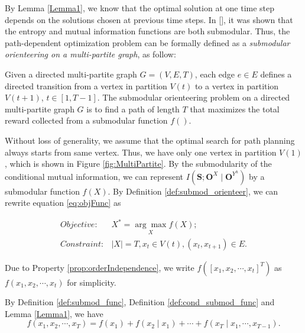 \documentclass[12pt]{article}
\begin{document}
By Lemma \ref{Lemma1}, we know that the optimal solution at one time step depends on the solutions chosen at previous time steps. 
In [\cite{krause2012submodular}], it was shown that the entropy and mutual information functions are both submodular.
Thus, the path-dependent optimization problem can be formally defined as a \emph{submodular orienteering on a multi-partite graph}, as follow:

\begin{mydef}
\label{def:submod_orienteer}
Given a directed multi-partite graph $ G = (V, E, T) $, each edge $ e \in E $ defines a directed transition from a vertex in partition $ V(t) $ to a vertex in partition $ V(t+1) $, $ t \in [1, T-1] $.
The submodular orienteering problem on a directed multi-partite graph $ G $ is to find a path of length $ T $ that maximizes the total reward collected from a submodular function $ f() $.
\end{mydef}

Without loss of generality, we assume that the optimal search for path planning always starts from same vertex.
Thus, we have only one vertex in partition $ V(1) $, which is shown in Figure \ref{fig:MultiPartite}.
By the submodularity of the conditional mutual information, we can represent $ I(\mathbf{S}; \mathbf{O}^{X} \mid \mathbf{O}^{Y^{h}}) $ by a submodular function  $ f(X) $. 
By Definition \ref{def:submod_orienteer}, we can rewrite equation 
 \eqref{eq:objFunc} as 

\begin{equation}
\label{eq:gnr_obj}
\begin{aligned}
Objective: & X^{*} = \underset{X}{\arg\max} f(X); \\
Constraint: & |X| = T, x_{t} \in V(t), (x_{t}, x_{t+1}) \in E.
\end{aligned}
\end{equation}

Due to Property \ref{prop:orderIndependence}, we write $ f( [x_{1}, x_{2} , \cdots , x_{t} ]^{T} ) $ as $ f(x_{1}, x_{2}, \cdots , x_{t}) $ for simplicity.

By Definition \ref{def:submod_func}, Definition \ref{def:cond_submod_func} and Lemma \ref{Lemma1}, we have
\begin{equation}
\label{eq:gnr_f_chain}
f(x_{1}, x_{2}, \cdots , x_{T}) = f(x_{1}) + f(x_{2} \mid x_{1}) + \cdots + f(x_{T} \mid x_{1}, \cdots , x_{T-1}).
\end{equation}
\end{document}
